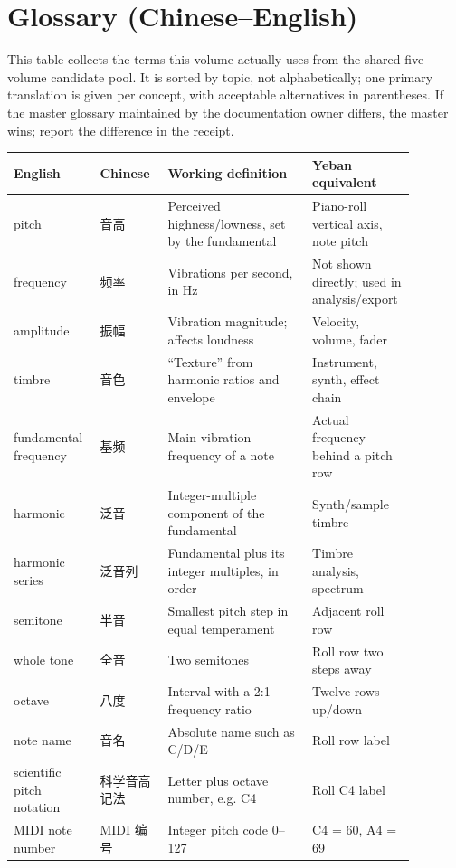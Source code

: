\section{Glossary (Chinese--English)}
\label{app:terms}

This table collects the terms this volume actually uses from the shared five-volume candidate pool. It is sorted by topic, not alphabetically; one primary translation is given per concept, with acceptable alternatives in parentheses. If the master glossary maintained by the documentation owner differs, the master wins; report the difference in the receipt.

\begin{center}
\footnotesize
\setlength{\tabcolsep}{3pt}
\begin{longtable}{p{0.20\linewidth}p{0.16\linewidth}p{0.34\linewidth}p{0.18\linewidth}}
\toprule
English & Chinese & Working definition & Yeban equivalent \\
\midrule
\endhead
pitch & 音高 & Perceived highness/lowness, set by the fundamental & Piano-roll vertical axis, note pitch \\
frequency & 频率 & Vibrations per second, in Hz & Not shown directly; used in analysis/export \\
amplitude & 振幅 & Vibration magnitude; affects loudness & Velocity, volume, fader \\
timbre & 音色 & ``Texture'' from harmonic ratios and envelope & Instrument, synth, effect chain \\
fundamental frequency & 基频 & Main vibration frequency of a note & Actual frequency behind a pitch row \\
harmonic & 泛音 & Integer-multiple component of the fundamental & Synth/sample timbre \\
harmonic series & 泛音列 & Fundamental plus its integer multiples, in order & Timbre analysis, spectrum \\
semitone & 半音 & Smallest pitch step in equal temperament & Adjacent roll row \\
whole tone & 全音 & Two semitones & Roll row two steps away \\
octave & 八度 & Interval with a 2:1 frequency ratio & Twelve rows up/down \\
note name & 音名 & Absolute name such as C/D/E & Roll row label \\
scientific pitch notation & 科学音高记法 & Letter plus octave number, e.g. C4 & Roll C4 label \\
MIDI note number & MIDI 编号 & Integer pitch code 0--127 & C4 = 60, A4 = 69 \\

\end{longtable}
\end{center}
